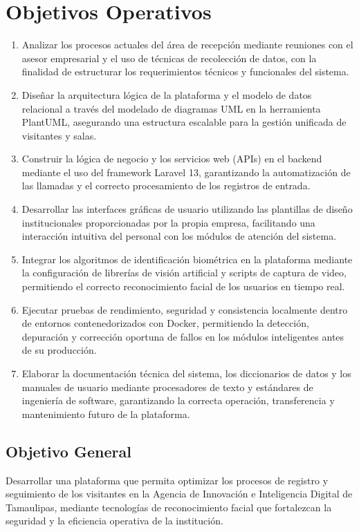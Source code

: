 \documentclass[12pt]{article}
\begin{document}
\clearpage
\section{Objetivos Operativos}

\begin{enumerate}
    \item Analizar los procesos actuales del área de recepción mediante reuniones con el asesor empresarial y el uso de técnicas de recolección de datos, con la finalidad de estructurar los requerimientos técnicos y funcionales del sistema.
    \item Diseñar la arquitectura lógica de la plataforma y el modelo de datos relacional a través del modelado de diagramas UML en la herramienta PlantUML, asegurando una estructura escalable para la gestión unificada de visitantes y salas.
    \item Construir la lógica de negocio y los servicios web (APIs) en el backend mediante el uso del framework Laravel 13, garantizando la automatización de las llamadas y el correcto procesamiento de los registros de entrada.
    \item Desarrollar las interfaces gráficas de usuario utilizando las plantillas de diseño institucionales proporcionadas por la propia empresa, facilitando una interacción intuitiva del personal con los módulos de atención del sistema.
    \item Integrar los algoritmos de identificación biométrica en la plataforma mediante la configuración de librerías de visión artificial y scripts de captura de video, permitiendo el correcto reconocimiento facial de los usuarios en tiempo real.
    \item Ejecutar pruebas de rendimiento, seguridad y consistencia localmente dentro de entornos contenedorizados con Docker, permitiendo la detección, depuración y corrección oportuna de fallos en los módulos inteligentes antes de su producción.
    \item Elaborar la documentación técnica del sistema, los diccionarios de datos y los manuales de usuario mediante procesadores de texto y estándares de ingeniería de software, garantizando la correcta operación, transferencia y mantenimiento futuro de la plataforma.
\end{enumerate}
\subsection{Objetivo General}
Desarrollar una plataforma que permita optimizar los procesos de registro y seguimiento de los visitantes en la Agencia de Innovación e Inteligencia Digital de Tamaulipas, mediante tecnologías de reconocimiento facial que fortalezcan la seguridad y la eficiencia operativa de la institución.
\end{document}

